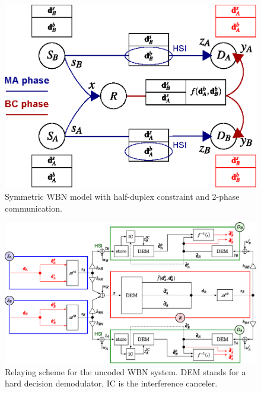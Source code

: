 \documentclass{article}
\begin{document}
\begin{figure}
\centering{}\includegraphics[width=0.6\columnwidth]{fig/2-SRN-sc_principle_BC-TWT_v4}
\caption{Symmetric WBN model with half-duplex constraint and 2-phase communication.\label{fig:CTUpp_Information_flows}}
\end{figure}


\begin{figure}
\begin{centering}
\includegraphics[width=1\textwidth]{fig/butterfly-2level_processing_principleTWC-uncoded}
\par\end{centering}
\caption{Relaying scheme for the uncoded WBN
system. DEM stands for a hard decision demodulator, IC is the interference
canceler.\label{fig:CTUpp_Information-flow-uncoded-block-scheme}}
\end{figure}
\end{document}
